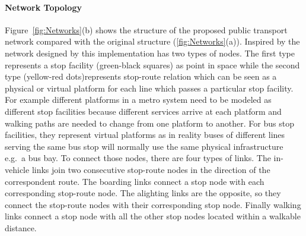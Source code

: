 \paragraph{Network Topology}

Figure~\ref{fig:Networks}(b) shows the structure of the proposed public transport network compared with the original structure (\ref{fig:Networks}(a)). Inspired by the network designed by \citet{SpiessFlorian_TransResB_1989} this implementation has two types of nodes. The first type represents a stop facility (green-black squares) as point in space while the second type (yellow-red dots)represents stop-route relation which can be seen as a physical or virtual platform for each line which passes a particular stop facility. For example different platforms in a metro system need to be modeled as different stop facilities because different services arrive at each platform and walking paths are needed to change from one platform to another. For bus stop facilities, they represent virtual platforms as in reality buses of different lines serving the same bus stop will normally use the same physical infrastructure e.g.\ a bus bay. To connect those nodes, there are four types of links. The in-vehicle links join two consecutive stop-route nodes in the direction of the correspondent route. The boarding links connect a stop node with each corresponding stop-route node. The alighting links are the opposite, so they connect the stop-route nodes with their corresponding stop node. Finally walking links connect a stop node with all the other stop nodes located within a walkable distance.

